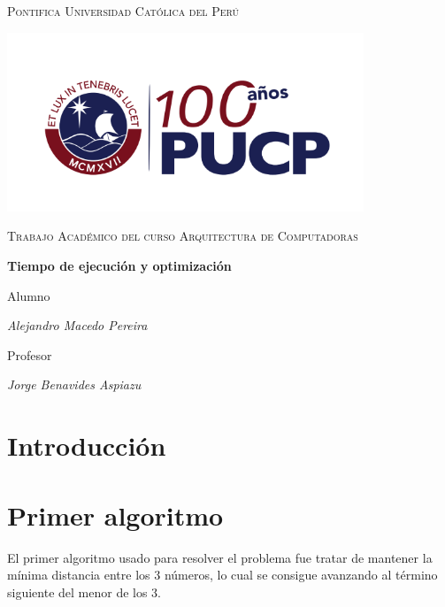 \documentclass[12pt]{article}
\begin{document}
\begin{titlepage}
   \centering
   {\scshape\LARGE Pontifica Universidad Católica del Perú \par}
   \includegraphics[width=0.8\textwidth]{img/logo}\par
   \vspace{1cm}
   {\scshape\Large Trabajo Académico del curso Arquitectura de Computadoras\par}
   \vspace{1.5cm}
   {\huge\bfseries Tiempo de ejecución y optimización \par}
   \vspace{2cm}
   {\Huge Alumno \par}
   \vspace{0.5cm}
   {\Large\itshape Alejandro Macedo Pereira \par}
   \vspace{2cm}
   {\Huge Profesor \par}
   \vspace{0.5cm}
   {\Large\itshape Jorge Benavides Aspiazu \par}
   \vfill
   {\Large {} \par}
\end{titlepage}

\section{Introducción}

\section{Primer algoritmo}
El primer algoritmo usado para resolver el problema fue tratar de mantener la mínima distancia entre los 3 números, lo cual
se consigue avanzando al término siguiente del menor de los 3.
\end{document}
